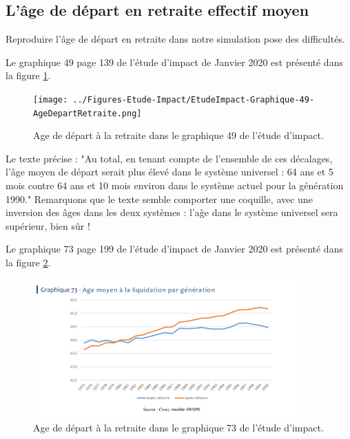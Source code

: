 \documentclass[10pt]{article}
\begin{document}

\subsection{L'âge de départ en retraite effectif moyen}

Reproduire l'âge de départ en retraite dans notre simulation 
pose des difficultés. 

Le graphique 49 page 139 de l'étude d'impact de Janvier 2020 est présenté 
dans la figure \ref{fig-age-etude-impact}.

\begin{figure}
\begin{center}
\texttt{[image: ../Figures-Etude-Impact/EtudeImpact-Graphique-49-AgeDepartRetraite.png]}
\end{center}
\caption{Age de départ à la retraite dans le graphique 49 de l'étude d'impact.}
\label{fig-age-etude-impact}
\end{figure}

Le texte précise : "Au total, en tenant compte de l’ensemble de ces 
décalages, l’âge moyen de départ serait plus élevé dans le système 
universel : 64 ans et 5 mois contre 64 ans et 10 mois environ dans 
le système actuel pour la génération 1990." 
Remarquons que le texte semble comporter une coquille, avec une inversion 
des âges dans les deux systèmes : l'aĝe dans le système universel sera supérieur, 
bien sûr ! 

Le graphique 73 page 199 de l'étude d'impact de Janvier 2020 est présenté 
dans la figure \ref{fig-age-etude-impact-graphique-73}.

\begin{figure}
\begin{center}
\includegraphics[width=0.9\textwidth]{../Figures-Etude-Impact/EtudeImpact-Graphique-73-AgeDepartRetraite.png}
\end{center}
\caption{Age de départ à la retraite dans le graphique 73 de l'étude d'impact.}
\label{fig-age-etude-impact-graphique-73}
\end{figure}
\end{document}
